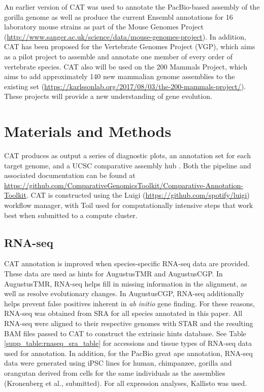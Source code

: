 \documentclass[fleqn,10pt]{wlscirep}
\begin{document}
An earlier version of CAT was used to annotate the PacBio-based assembly of the gorilla genome \cite{gordon2016long} as well as produce the current Ensembl annotations for 16 laboratory mouse strains as part of the Mouse Genomes Project (\url{http://www.sanger.ac.uk/science/data/mouse-genomes-project}). In addition, CAT has been proposed for the Vertebrate Genomes Project (VGP), which aims as a pilot project to assemble and annotate one member of every order of vertebrate species. CAT also will be used on the 200 Mammals Project, which aims to add approximately 140 new mammalian genome assemblies to the existing set (\url{https://karlssonlab.org/2017/08/03/the-200-mammals-project/}). These projects will provide a new understanding of gene evolution.

\section*{Materials and Methods}

CAT produces as output a series of diagnostic plots, an annotation set for each target genome, and a UCSC comparative assembly hub \cite{nguyen2014comparative}. Both the pipeline and associated documentation can be found at \url{https://github.com/ComparativeGenomicsToolkit/Comparative-Annotation-Toolkit}. CAT is constructed using the Luigi (\url{https://github.com/spotify/luigi}) workflow manager, with Toil \cite{vivian2017toil} used for computationally intensive steps that work best when submitted to a compute cluster. 

\subsection*{RNA-seq}

CAT annotation is improved when species-specific RNA-seq data are provided. These data are used as hints for AugustusTMR and AugustusCGP. In AugustusTMR, RNA-seq helps fill in missing information in the alignment, as well as resolve evolutionary changes. In AugustusCGP, RNA-seq additionally helps prevent false positives inherent in \textit{ab initio} gene finding. For these reasons, RNA-seq was obtained from SRA for all species annotated in this paper. All RNA-seq were aligned to their respective genomes with STAR \cite{dobin2013star} and the resulting BAM files passed to CAT to construct the extrinsic hints database. See Table \ref{supp_table:rnaseq_sra_table} for accessions and tissue types of RNA-seq data used for annotation. In addition, for the PacBio great ape annotation, RNA-seq data were generated using iPSC lines for human, chimpanzee, gorilla and orangutan derived from cells for the same individuals as the assemblies (Kronenberg et al., submitted). For all expression analyses, Kallisto \cite{bray2015near} was used.
\end{document}
